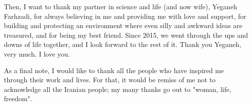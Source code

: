 Then, I want to thank my partner in science and life (and now wife), Yeganeh Farhzadi, for always believing in me and providing me with love and support, for building and protecting an environment where even silly and awkward ideas are treasured, and for being my best friend. Since 2015, we went through the ups and downs of life together, and I look forward to the rest of it. Thank you Yeganeh, very much. I love you.

As a final note, I would like to thank all the people who have inspired me through their work and lives. For that, it would be remiss of me not to acknowledge all the Iranian people; my many thanks go out to "woman, life, freedom".


